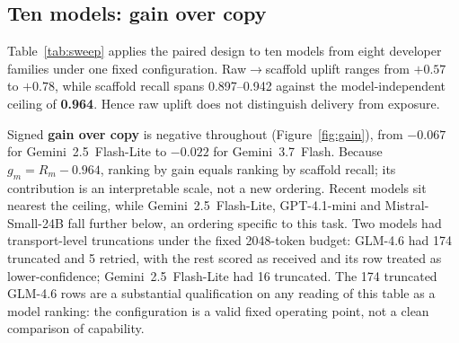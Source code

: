 \documentclass[10pt,twocolumn]{article}
\begin{document}
\subsection{Ten models: gain over copy}\label{sec:tenmodel}
Table~\ref{tab:sweep} applies the paired design to ten models from eight developer families under one fixed configuration. Raw$\to$scaffold uplift ranges from $+0.57$ to $+0.78$, while scaffold recall spans 0.897--0.942 against the model-independent ceiling of \textbf{0.964}. Hence raw uplift does not distinguish delivery from exposure.

Signed \textbf{gain over copy} is negative throughout (Figure~\ref{fig:gain}), from $-0.067$ for Gemini~2.5~Flash-Lite to $-0.022$ for Gemini~3.7~Flash. Because $g_m=R_m-0.964$, ranking by gain equals ranking by scaffold recall; its contribution is an interpretable scale, not a new ordering. Recent models sit nearest the ceiling, while Gemini~2.5~Flash-Lite, GPT-4.1-mini and Mistral-Small-24B fall further below, an ordering specific to this task. Two models had transport-level truncations under the fixed 2048-token budget: GLM-4.6 had 174 truncated and 5 retried, with the rest scored as received and its row treated as lower-confidence; Gemini~2.5~Flash-Lite had 16 truncated. The 174 truncated GLM-4.6 rows are a substantial qualification on any reading of this table as a model ranking: the configuration is a valid fixed operating point, not a clean comparison of capability.
\end{document}
